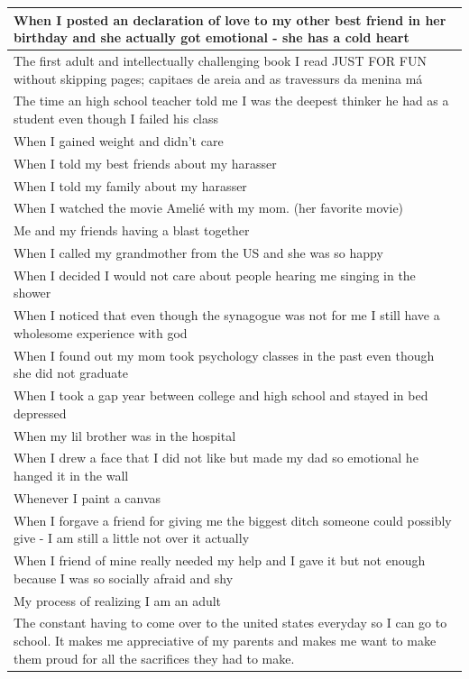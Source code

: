 \documentclass[
  .7em,
  letterpaper,
  DIV=11,
  numbers=noendperiod]{scrartcl}
\begin{document}
\begin{table}
\begin{tabular}{l}
\hline
When I posted an declaration of love to my other best friend in her birthday and she actually got emotional - she has a cold heart\\
\hline
The first adult and intellectually challenging book I read JUST FOR FUN without skipping pages; capitaes de areia and as travessurs da menina má\\
\hline
The time an high school teacher told me I was the deepest thinker he had as a student even though I failed his class\\
\hline
When I gained weight and didn't care\\
\hline
When I told my best friends about my harasser\\
\hline
When I told my family about my harasser\\
\hline
When I watched the movie Amelié with my mom. (her favorite movie)\\
\hline
Me and my friends having a blast together\\
\hline
When I called my grandmother from the US and she was so happy\\
\hline
When I decided I would not care about people hearing me singing in the shower\\
\hline
When I noticed that even though the synagogue was not for me I still have a wholesome experience with god\\
\hline
When I found out my mom took psychology classes in the past even though she did not graduate\\
\hline
When I took a gap year between college and high school and stayed in bed depressed\\
\hline
When my lil brother was in the hospital\\
\hline
When I drew a face that I did not like but made my dad so emotional he hanged it in the wall\\
\hline
Whenever I paint a canvas\\
\hline
When I forgave a friend for giving me the biggest ditch someone could possibly give - I am still a little not over it actually\\
\hline
When I friend of mine really needed my help and I gave it but not enough because I was so socially afraid and shy\\
\hline
My process of realizing I am an adult\\
\hline
The constant having to come over to the united states everyday so I can go to school. It makes me appreciative of my parents and makes me want to make them proud for all the sacrifices they had to make.\\

\end{tabular}
\end{table}
\end{document}
